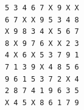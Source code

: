 \begin{Verbatim}[fontsize=\small, frame=single]
5 3 4 6 7 X 9 X X
6 7 X X 9 5 3 4 8
X 9 8 3 4 X 5 6 7
8 X 9 7 6 X X 2 3
4 X 6 X 5 3 7 9 1
7 1 3 9 X 4 8 5 6
9 6 1 5 3 7 2 X 4
2 8 7 4 1 9 6 3 5
X 4 5 X 8 6 1 7 9
\end{Verbatim}
